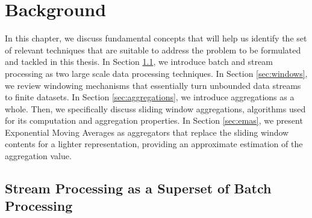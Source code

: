 \chapter{Background}\label{chap:background} \minitoc

In this chapter, we discuss fundamental concepts that will help us identify the set of relevant techniques that are suitable to address the problem to be formulated and tackled in this thesis. In Section \ref{sec:stream-superset}, we introduce batch and stream processing as two large scale data processing techniques. In Section \ref{sec:windows}, we review windowing mechanisms that essentially turn unbounded data streams to finite datasets. In Section \ref{sec:aggregations}, we introduce aggregations as a whole. Then, we specifically discuss sliding window aggregations, algorithms used for its computation and aggregation properties. In Section \ref{sec:emas}, we present Exponential Moving Averages as aggregators that replace the sliding window contents for a lighter representation, providing an approximate estimation of the aggregation value.

\section{Stream Processing as a Superset of Batch Processing} \label{sec:stream-superset}

